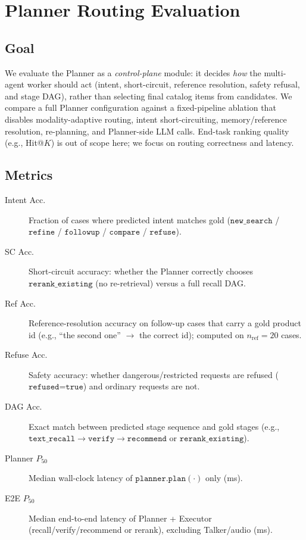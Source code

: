 
\section{Planner Routing Evaluation}
\label{sec:planner-eval}

\subsection{Goal}
We evaluate the Planner as a \emph{control-plane} module: it decides \emph{how} the multi-agent worker should act (intent, short-circuit, reference resolution, safety refusal, and stage DAG), rather than selecting final catalog items from candidates.
We compare a full Planner configuration against a fixed-pipeline ablation that disables modality-adaptive routing, intent short-circuiting, memory/reference resolution, re-planning, and Planner-side LLM calls.
End-task ranking quality (e.g., Hit@$K$) is out of scope here; we focus on routing correctness and latency.

\subsection{Metrics}
\begin{description}
  \item[Intent Acc.] Fraction of cases where predicted intent matches gold
    ($\texttt{new\_search}$ / $\texttt{refine}$ / $\texttt{followup}$ / $\texttt{compare}$ / $\texttt{refuse}$).
  \item[SC Acc.] Short-circuit accuracy: whether the Planner correctly chooses
    $\texttt{rerank\_existing}$ (no re-retrieval) versus a full recall DAG.
  \item[Ref Acc.] Reference-resolution accuracy on follow-up cases that carry a gold product id
    (e.g., ``the second one'' $\rightarrow$ the correct id); computed on $n_{\mathrm{ref}}=20$ cases.
  \item[Refuse Acc.] Safety accuracy: whether dangerous/restricted requests are refused
    ($\texttt{refused=true}$) and ordinary requests are not.
  \item[DAG Acc.] Exact match between predicted stage sequence and gold stages
    (e.g., $\texttt{text\_recall}\!\rightarrow\!\texttt{verify}\!\rightarrow\!\texttt{recommend}$
    or $\texttt{rerank\_existing}$).
  \item[Planner $P_{50}$] Median wall-clock latency of $\texttt{planner.plan}(\cdot)$ only (ms).
  \item[E2E $P_{50}$] Median end-to-end latency of Planner + Executor
    (recall/verify/recommend or rerank), excluding Talker/audio (ms).
\end{description}


